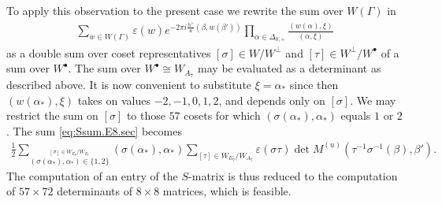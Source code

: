 \documentclass[12pt]{amsart}
\theoremstyle{plain}
\theoremstyle{definition}
\numberwithin{equation}{section}
\newcommand{\al}{\alpha}
\newcommand{\D}{\Delta}
\newcommand{\alstar}{{\alpha_*}}
\begin{document}
To apply this observation to the present case we rewrite the sum over $W(\Gamma)$ in
\begin{align}\label{eq:Ssum.E8.sec}
\sum_{w \in W(\Gamma)} \varepsilon(w) e^{-2\pi i \frac{h^\vee}{u} (\beta, w(\beta'))} \prod_{\al \in \D_{0, +}} \frac{(w(\al), \xi)}{(\al, \xi)}
\end{align}
as a double sum over coset representatives $[\sigma] \in W / W^\perp$ and $[\tau] \in W^\perp / W^\bullet$ of a sum over $W^\bullet$. The sum over $W^\bullet \cong W_{A_7}$ may be evaluated as a determinant as described above. It is now convenient to substitute $\xi = \alstar$ since then $\left(w(\alstar), \xi\right)$ takes on values $-2, -1, 0, 1, 2$, and depends only on $[\sigma]$. We may restrict the sum on $[\sigma]$ to those $57$ cosets for which $\left(\sigma(\alstar), \alstar\right)$ equals $1$ or $2$. The sum \eqref{eq:Ssum.E8.sec} becomes
\begin{align*}
\frac{1}{2} \sum_{\stackrel{[\sigma] \in W_{E_8} / W_{E_7}}{\left(\sigma(\alstar), \alstar\right) \in \{1, 2\}}} {\left(\sigma(\alstar), \alstar\right)} \sum_{[\tau] \in W_{E_7} / W_{A_7}} \varepsilon(\sigma\tau) \det{M^{(u)}(\tau^{-1}\sigma^{-1}(\beta), \beta')}.
\end{align*}
The computation of an entry of the $S$-matrix is thus reduced to the computation of $57 \times 72$ determinants of $8 \times 8$ matrices, which is feasible.
\end{document}
